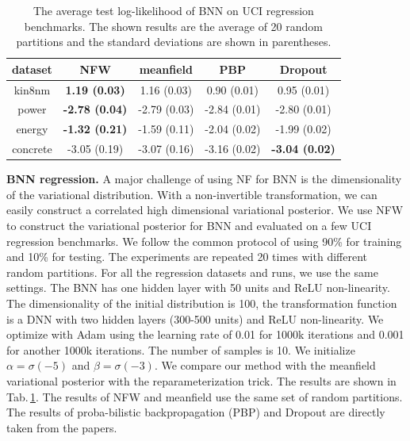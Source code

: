 \documentclass[twoside]{article}
\newcommand{\acr}[1]{\textsc{#1}\xspace}
\newcommand{\us}{\acr{NFW}}
\begin{document}

\begin{table}[h]
\centering
 \begin{tabular}{c c c c c} 
 \hline
 dataset & \us & meanfield  & PBP & Dropout \\ [0.5ex] 
 \hline\hline
 kin8nm & \textbf{1.19 (0.03)} & 1.16 (0.03) &  0.90 (0.01) & 0.95 (0.01)\\ 
 power & \textbf{-2.78 (0.04)} &  -2.79 (0.03) & -2.84 (0.01) & -2.80 (0.01)\\
 energy & \textbf{-1.32 (0.21)} & -1.59 (0.11)  & -2.04 (0.02) & -1.99 (0.02)\\
 concrete & -3.05 (0.19) & -3.07 (0.16) & -3.16 (0.02) & \textbf{-3.04 (0.02)}\\
 \hline
\end{tabular}
\vspace{1mm}
\caption{The average test log-likelihood of BNN on UCI regression benchmarks. The shown results are the average of 20 random partitions and the standard deviations are shown in parentheses.} \label{tab:bnn_regression}
\vspace{-5mm}
\end{table}

\textbf{BNN regression.} A major challenge of using NF for BNN is the dimensionality of the variational distribution. With a non-invertible transformation, we can easily construct a correlated high dimensional variational posterior. We use \us to construct the variational posterior for BNN and evaluated on a few UCI regression benchmarks. We follow the common protocol of using 90\% for training and 10\% for testing. The experiments are repeated 20 times with different random partitions. For all the regression datasets and runs, we use the same settings. The BNN has one hidden layer with 50 units and ReLU non-linearity. The dimensionality of the initial distribution is 100, the transformation function is a DNN with two hidden layers (300-500 units) and ReLU non-linearity. We optimize with Adam using the learning rate of 0.01 for 1000k iterations and 0.001 for another 1000k iterations. The number of samples is 10. We initialize $\alpha=\sigma(-5)$ and $\beta=\sigma(-3)$. We compare our method with the meanfield variational posterior with the reparameterization trick. The results are shown in Tab.\,\ref{tab:bnn_regression}. The results of \us and meanfield use the same set of random partitions. The results of proba-bilistic backpropagation (PBP) \citep{hernandezAdams2015} and Dropout \citep{GalGhahramani2016} are directly taken from the papers.
\end{document}
